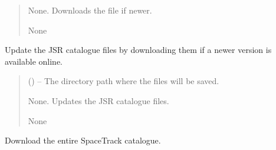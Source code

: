 \documentclass[letterpaper,10pt,english]{sphinxmanual}
\begin{document}
\begin{fulllineitems}
\begin{fulllineitems}
\begin{quote}
\begin{description}
\sphinxAtStartPar
None. Downloads the file if newer.

\sphinxAtStartPar
None

\end{description}\end{quote}

\end{fulllineitems}


\begin{fulllineitems}
\label{\detokenize{fspsim.utils:fspsim.utils.SpaceCatalogue.SpaceCatalogue.PullCatalogueJSR}}
\pysigstartsignatures
{}
\pysigstopsignatures
\sphinxAtStartPar
Update the JSR catalogue files by downloading them if a newer version is available online.
\begin{quote}\begin{description}
\sphinxAtStartPar
{} () – The directory path where the files will be saved.

\sphinxAtStartPar
None. Updates the JSR catalogue files.

\sphinxAtStartPar
None

\end{description}\end{quote}

\end{fulllineitems}


\begin{fulllineitems}
\label{\detokenize{fspsim.utils:fspsim.utils.SpaceCatalogue.SpaceCatalogue.PullCatalogueSpaceTrack}}
\pysigstartsignatures
{}
\pysigstopsignatures
\sphinxAtStartPar
Download the entire SpaceTrack catalogue.


\end{fulllineitems}
\end{fulllineitems}
\end{document}
